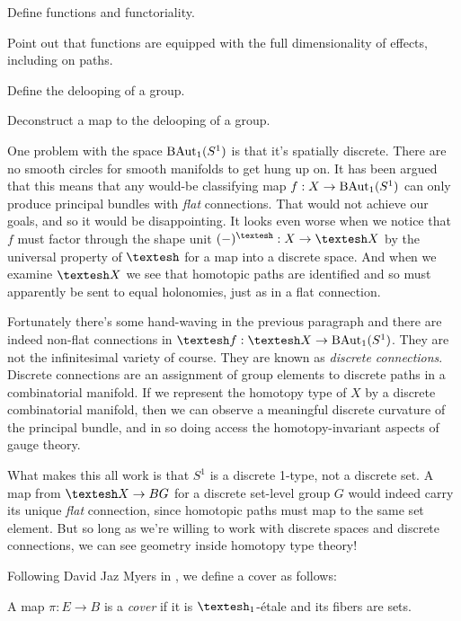 \documentclass[12pt]{article}
\begin{document}
Define functions and functoriality.

Point out that functions are equipped with the full dimensionality of effects, including on paths.

Define the delooping of a group.

Deconstruct a map to the delooping of a group.


One problem with the space \( \mathrm{BAut}_1(S^1) \) is that it's spatially discrete. There are no smooth circles for smooth manifolds to get hung up on. It has been argued that this means that any would-be classifying map \( f:X\to \mathrm{BAut}_1(S^1) \) can only produce principal bundles with \emph{flat} connections. That would not achieve our goals, and so it would be disappointing. It looks even worse when we notice that \( f \) must factor through the shape unit \( (-)^\shape:X\to\shape X \) by the universal property of \( \shape \) for a map into a discrete space. And when we examine \( \shape X \) we see that homotopic paths are identified and so must apparently be sent to equal holonomies, just as in a flat connection.

Fortunately there's some hand-waving in the previous paragraph and there are indeed non-flat connections in \( \shape f:\shape X\to \BAutoso \). They are not the infinitesimal variety of course. They are known as \emph{discrete connections}\cite{crane_connections}\cite{crane_ddg}. Discrete connections are an assignment of group elements to discrete paths in a combinatorial manifold. If we represent the homotopy type of \( X \) by a discrete combinatorial manifold, then we can observe a meaningful discrete curvature of the principal bundle, and in so doing access the homotopy-invariant aspects of gauge theory.

What makes this all work is that \( S^1 \) is a discrete 1-type, not a discrete set. A map from \( \shape X\to BG \) for a discrete set-level group \( G \) would indeed carry its unique \emph{flat} connection, since homotopic paths must map to the same set element. But so long as we're willing to work with discrete spaces and discrete connections, we can see geometry inside homotopy type theory!

Following David Jaz Myers in \cite{myersgood}, we define a cover as follows:

\begin{mydef}
  A map \(\pi:E\to B\) is a \emph{cover} if it is \(\shapeo\)-étale and its fibers are sets.
\end{mydef}
\end{document}
